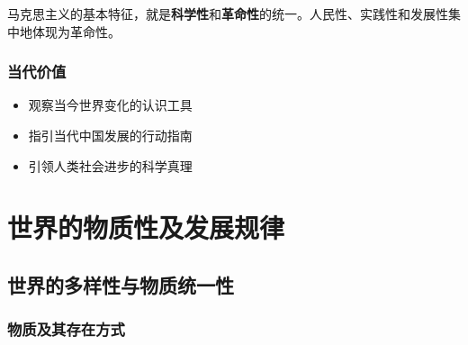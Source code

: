 \documentclass[12pt, a4paper, oneside]{ctexart}
\begin{document}
马克思主义的基本特征，就是\textbf{科学性}和\textbf{革命性}的统一。人民性、实践性和发展性集中地体现为革命性。

\subsubsection{当代价值}

\begin{itemize}
  \item 观察当今世界变化的认识工具
  \item 指引当代中国发展的行动指南
  \item 引领人类社会进步的科学真理
\end{itemize}

\section{世界的物质性及发展规律}

\subsection{世界的多样性与物质统一性}

\subsubsection{物质及其存在方式}
\end{document}
